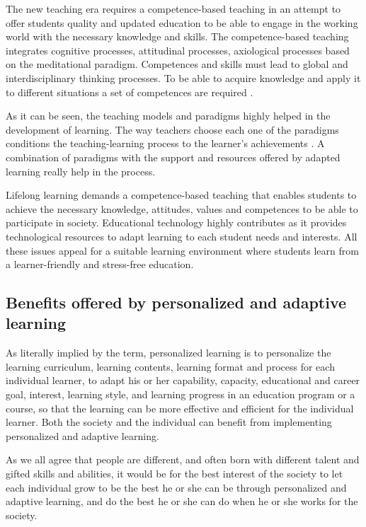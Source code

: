 \documentclass[english]{textolivre}
\begin{document}
The new teaching era requires a competence-based teaching in an attempt to offer students quality and updated education to be able to engage in the working world with the necessary knowledge and skills. The competence-based teaching integrates cognitive processes, attitudinal processes, axiological processes based on the meditational paradigm. Competences and skills must lead to global and interdisciplinary thinking processes. To be able to acquire knowledge and apply it to different situations a set of competences are required \cite{soler2013}.

As it can be seen, the teaching models and paradigms highly helped in the development of learning. The way teachers choose each one of the paradigms conditions the teaching-learning process to the learner’s achievements \cite{de_miguel2006}. A combination of paradigms with the support and resources offered by adapted learning really help in the process.

Lifelong learning demands a competence-based teaching that enables students to achieve the necessary knowledge, attitudes, values and competences to be able to participate in society. Educational technology highly contributes as it provides technological resources to adapt learning to each student needs and interests. All these issues appeal for a suitable learning environment where students learn from a learner-friendly and stress-free education.

\subsection{Benefits offered by personalized and adaptive learning}
As literally implied by the term, personalized learning is to personalize the learning curriculum, learning contents, learning format and process for each individual learner, to adapt his or her capability, capacity, educational and career goal, interest, learning style, and learning progress in an education program or a course, so that the learning can be more effective and efficient for the individual learner. Both the society and the individual can benefit from implementing personalized and adaptive learning.

As we all agree that people are different, and often born with different talent and gifted skills and abilities, it would be for the best interest of the society to let each individual grow to be the best he or she can be through personalized and adaptive learning, and do the best he or she can do when he or she works for the society.  
\end{document}
